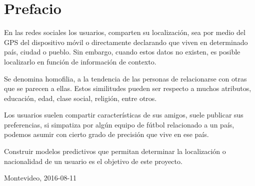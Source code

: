 \section*{Prefacio}

En las redes sociales los usuarios, comparten su localización, sea por medio del GPS del dispositivo móvil o directamente declarando que viven en determinado país, ciudad o pueblo. Sin embargo, cuando estos datos no existen, es posible localizarlo en función de información de contexto. 

Se denomina homofilia, a la tendencia de las personas de relacionarse con otras que se parecen a ellas. Estos similitudes pueden ser respecto a muchos atributos, educación, edad, clase social, religión, entre otros.

Los usuarios suelen compartir características de sus amigos, suele publicar sus preferencias, si simpatiza por algún equipo de fútbol relacionado a un país, podemos asumir con cierto grado de precisión que vive en ese país. 

Construir modelos predictivos que permitan determinar la localización o nacionalidad de un usuario es el objetivo de este proyecto.


\begin{flushright}
Montevideo, 2016-08-11 \\[1pc]
\end{flushright}


